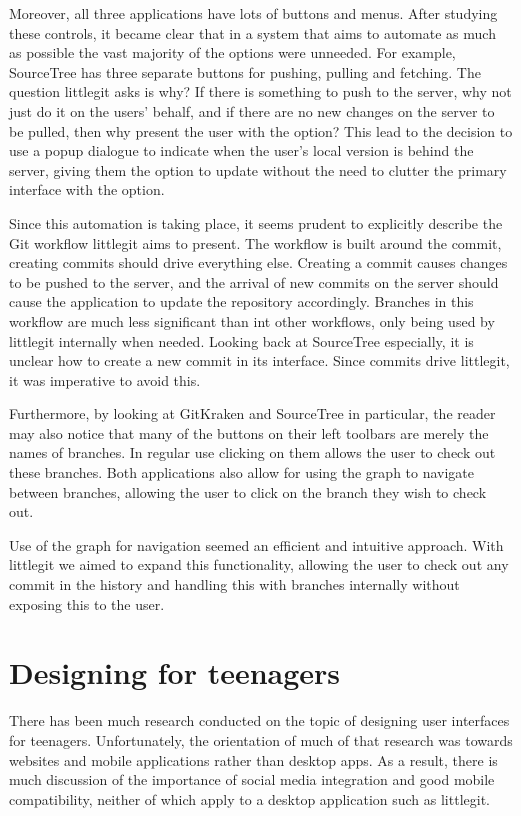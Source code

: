 Moreover, all three applications have lots of buttons and menus. After studying these controls, it became clear that in a system that aims to automate as much as possible the vast majority of the options were unneeded. For example, SourceTree has three separate buttons for pushing, pulling and fetching. The question littlegit asks is why? If there is something to push to the server, why not just do it on the users' behalf, and if there are no new changes on the server to be pulled, then why present the user with the option? This lead to the decision to use a popup dialogue to indicate when the user's local version is behind the server, giving them the option to update without the need to clutter the primary interface with the option.

Since this automation is taking place, it seems prudent to explicitly describe the Git workflow littlegit aims to present. The workflow is built around the commit, creating commits should drive everything else. Creating a commit causes changes to be pushed to the server, and the arrival of new commits on the server should cause the application to update the repository accordingly. Branches in this workflow are much less significant than int other workflows, only being used by littlegit internally when needed. Looking back at SourceTree especially, it is unclear how to create a new commit in its interface. Since commits drive littlegit, it was imperative to avoid this.

Furthermore, by looking at GitKraken and SourceTree in particular, the reader may also notice that many of the buttons on their left toolbars are merely the names of branches. In regular use clicking on them allows the user to check out these branches. Both applications also allow for using the graph to navigate between branches, allowing the user to click on the branch they wish to check out. 

Use of the graph for navigation seemed an efficient and intuitive approach. With littlegit we aimed to expand this functionality, allowing the user to check out any commit in the history and handling this with branches internally without exposing this to the user.

\section {Designing for teenagers}\label{sec:teen-design}

There has been much research conducted on the topic of designing user interfaces for teenagers. Unfortunately, the orientation of much of that research was towards websites and mobile applications rather than desktop apps. As a result, there is much discussion of the importance of social media integration and good mobile compatibility, neither of which apply to a desktop application such as littlegit.

